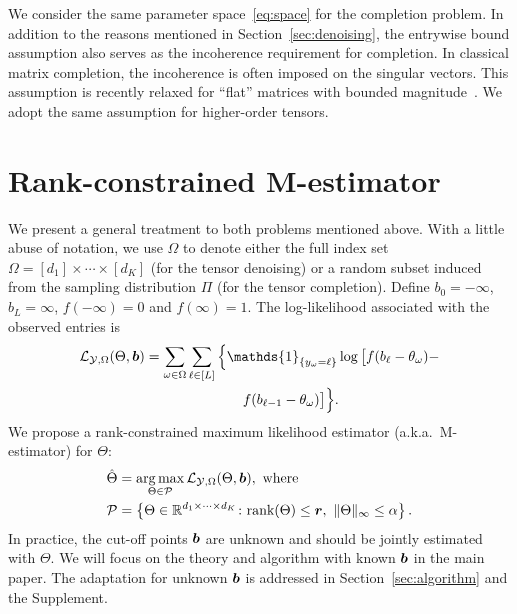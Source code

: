 \documentclass{article}
\theoremstyle{plain}
\theoremstyle{definition}
\begin{document}
We consider the same parameter space~\eqref{eq:space} for the completion problem. In addition to the reasons mentioned in Section~\ref{sec:denoising}, the entrywise bound assumption also serves as the incoherence requirement for completion. In classical matrix completion, the incoherence is often imposed on the singular vectors. This assumption is recently relaxed for ``flat'' matrices with bounded magnitude~\cite{negahban2011estimation,cai2013max,bhaskar20151}. We adopt the same assumption for higher-order tensors.

\section{Rank-constrained M-estimator}\label{sec:theory}
\vspace{-.1cm}
We present a general treatment to both problems mentioned above. With a little abuse of notation, we use $\Omega$ to denote either the full index set $\Omega=[d_1]\times \cdots \times [d_K]$ (for the tensor denoising) or a random subset induced from the sampling distribution $\Pi$ (for the tensor completion). Define $b_0=-\infty$, $b_L=\infty$, $f(-\infty)=0$ and $f(\infty)=1$. The log-likelihood associated with the observed entries is
\begin{align}\label{eq:objective}
\logl(\Theta, \mb)&=\sum_{\omega\in\Omega}\sum_{\ell\in[L]} \Big\{\mathds{1}_{\{y_\omega=\ell\}} \log \big[f(b_\ell-\theta_\omega)- \notag \\
&\quad \quad \quad \quad \quad \quad \quad  f(b_{\ell-1}-\theta_\omega)\big]\Big\}.
\end{align}
We propose a rank-constrained maximum likelihood estimator (a.k.a.\ M-estimator) for $\Theta$:
\begin{align}\label{eq:estimator}
\hat \Theta&=\argmax_{\Theta\in \tP}\logl(\Theta, \mb),\ \text{where}\notag \\
\tP&=\left\{\Theta\in\mathbb{R}^{d_1\times \cdots \times d_K} \colon \text{rank}(\Theta)\leq \mr,\ \mnormSize{}{\Theta}\leq \alpha\right\}.
 \end{align}
In practice, the cut-off points $\bm{b}$ are unknown and should be jointly estimated with $\Theta$. We will focus on the theory and algorithm with known $\bm{b}$ in the main paper. The adaptation for unknown $\bm{b}$ is addressed in Section~\ref{sec:algorithm} and the Supplement.
\end{document}
